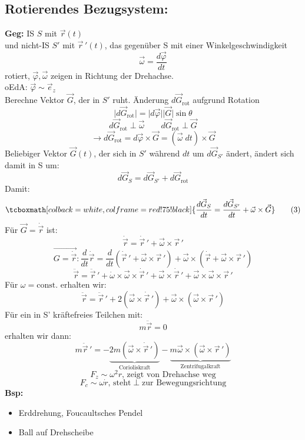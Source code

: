 \documentclass[titlepage,12pt,a4paper,ngerman]{report}
\newcommand{\tx}[1]{\textrm{#1}}
\newcommand{\const}{\tx{const.}}
\newcommand{\rmbox}[1]{\tcboxmath[colback=white,colframe=red!75!black]{#1}} %
\renewcommand{\boxed}{\rmbox}
\begin{document}
\subsection{Rotierendes Bezugsystem:}
\textbf{Geg:} IS $S$ mit $\vec{r}(t)$\\
und nicht-IS $S'$ mit $\vec{r}\,'(t)$, das gegenüber S mit einer Winkelgeschwindigkeit
\begin{equation*}
\vec{\omega} = \frac{d\vec{\varphi}}{dt} \tag{1}
\end{equation*}
rotiert, $\vec{\varphi}, \vec{\omega}$ zeigen in Richtung der Drehachse.\\
oEdA: $\vec{\varphi} \sim \vec{e}_z$\\
Berechne Vektor $\vec{G}$, der in $S'$ ruht. Änderung $d\vec{G}_{\tx{rot}}$ aufgrund Rotation
$$\vert d \vec{G}_{\tx{rot}} \vert = \vert d\vec{\varphi} \vert \vert \vec{G} \vert \sin \theta $$
$$d\vec{G}_{\tx{rot}} \perp \vec{\omega}  \qquad d\vec{G}_{\tx{rot}} \perp \vec{G}$$
\begin{equation*}
\rightarrow d\vec{G}_{\tx{rot}} = d\vec{\varphi} \times \vec{G} = (\vec{\omega}\; dt) \times \vec{G} \tag{2}
\end{equation*}
Beliebiger Vektor $\vec{G}(t)$, der sich in $S'$ während $dt$ um $d\vec{G}_{S'}$ ändert, ändert sich damit in S um:
$$d\vec{G}_{S} = d\vec{G}_{S'} + d\vec{G}_{\tx{rot}}$$
Damit:
\begin{equation*}
\boxed{\frac{d\vec{G}_{S}}{dt} = \frac{d\vec{G}_{S'}}{dt} + \vec{\omega} \times \vec{G}} \tag{3}
\end{equation*}
Für $ \vec{G} = \dot{\vec{r}}$ ist:
\begin{equation*}
\dot{\vec{r}} = \dot{\vec{r}}\,' + \vec{\omega} \times \vec{r}\,' \tag{4}
\end{equation*}
$$\vec{G = \dot{\vec{r}}} : \frac{d}{dt} \dot{\vec{r}} = \frac{d}{dt} (\dot{\vec{r}}\,' + \vec{\omega} \times \vec{r}\,' ) + \vec{\omega} \times (\dot{\vec{r}} + \vec{\omega} \times \vec{r}\,')$$
$$\ddot{\vec{r}} = \ddot{\vec{r}}\,' + \dot{\omega} \times \vec{\omega} \times \dot{\vec{r}}\,' + \vec{\omega} \times \dot{\vec{r}}\,' + \vec{\omega}\times \vec{\omega}\times \vec{r}\,'$$
Für $\omega= \const$ erhalten wir:
$$\ddot{\vec{r}} = \ddot{\vec{r}}\,' + 2(\vec{\omega} \times \dot{\vec{r}}\,') + \vec{\omega} \times ( \vec{ \omega} \times \vec{r}\,')$$
Für ein in S' kräftefreies Teilchen mit:
$$m\ddot{\vec{r}} = 0$$
erhalten wir dann:
$$m\ddot{\vec{r}}\,'= - \underbrace{2 m (\vec{\omega} \times \dot{\vec{r}}\,')}_{\tx{Corioliskraft}} -\underbrace{ m \vec{\omega}\times (\vec{\omega} \times \vec{r}\,')}_{\tx{Zentrifugalkraft}}$$
$$F_z \sim \omega^2r \textrm{, zeigt von Drehachse weg}$$
$$F_c \sim \omega\dot{r} \textrm{, steht} \perp \textrm{zur Bewegungsrichtung}$$
\textbf{Bsp:} 
\begin{itemize}
	\item Erddrehung, Foucaultsches Pendel
	\item Ball auf Drehscheibe
\end{itemize}
\end{document}
